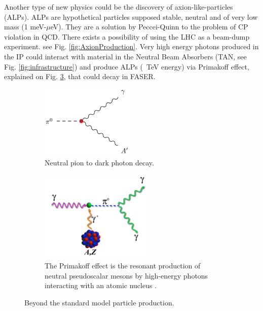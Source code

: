 Another type of new physics could be the discovery of axion-like-particles (ALPs). ALPs are hypothetical particles supposed stable, neutral and of very low mass (1 meV-$\mu$eV). They are a solution by Peccei-Quinn to the problem of CP violation in QCD.
There exists a possibility of using the LHC as a beam-dump experiment. see Fig. \ref{fig:AxionProduction}. Very high energy photons produced in the IP could interact with material in the Neutral Beam Absorbers (TAN, see Fig. \ref{fig:infrastructure}) and produce ALPs (~TeV energy) via Primakoff effect, explained on Fig. \ref{fig:Primakoff}, that could decay in FASER.

\begin{figure}[hbp!]
    \begin{subfigure}[t]{.5\textwidth}\centering
        \includegraphics[width=0.5\textwidth]{DarkPhoton.png}
        \caption[Neutral Pion Decay]{Neutral pion to dark photon decay.}
        \label{fig:Dark Photon}
    \end{subfigure}%
    \begin{subfigure}[t]{.5\textwidth}\centering
        \includegraphics[width=0.6\textwidth]{Primakoff.png}
        \caption[Primakoff Effect]{The Primakoff effect is the resonant production of neutral pseudoscalar mesons by high-energy photons interacting with an atomic nucleus \cite{kang_standard_1978}.}
        \label{fig:Primakoff}
    \end{subfigure}
    \caption{Beyond the standard model particle production.}
\end{figure}

